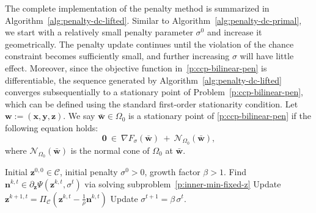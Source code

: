 \documentclass[11pt]{article}
\def\bs{\boldsymbol}
\def\C{\mathcal{C}}
\def\N{\mathcal{N}}
\begin{document}
The complete implementation of the penalty method is summarized in Algorithm~\ref{alg:penalty-dc-lifted}. Similar to Algorithm~\ref{alg:penalty-dc-primal}, we start with a relatively small penalty parameter $\sigma^0$ and increase it geometrically. The penalty update continues until the violation of the chance constraint becomes sufficiently small, and further increasing $\sigma$ will have little effect. Moreover, since the objective function in~\eqref{p:ccp-bilinear-pen} is differentiable, the sequence generated by Algorithm~\ref{alg:penalty-dc-lifted} converges subsequentially to a stationary point of Problem~\eqref{p:ccp-bilinear-pen}, which can be defined using the standard first-order stationarity condition. Let $\bs{w}:=(\bs{x},\bs{y},\bs{z})$. We say $\bar{\bs{w}}\in\Omega_0$ is a stationary point of \eqref{p:ccp-bilinear-pen} if the following equation holds:
\begin{equation*} 
\bs{0}\ \in\ \nabla F_\sigma(\bar{\bs{w}})\ +\ \N_{\Omega_0}(\bar{\bs{w}}),
\end{equation*}
where $\N_{\Omega_0}(\bar{\bs{w}})$ is the normal cone of $\Omega_0$ at $\bar{\bs{w}}$.

\begin{algorithm}[ht]
\caption{Penalty Based Proximal DC Algorithm in the Lifted Space}\label{alg:penalty-dc-lifted}
\begin{algorithmic}[1]
\Require Initial $\bs{z}^{0,0} \in \C$, initial penalty $\sigma^0>0$, growth factor $\beta>1$.
\State Find $\bs{n}^{k,t} \in \partial_{\bs{z}}\Psi(\bs{z}^{k,t},\sigma^t)$ via solving subproblem~\eqref{p:inner-min-fixed-z}
\State Update $\bs{z}^{k+1,t} = \Pi_{\C}(\bs{z}^{k,t}-\frac{1}{\rho}\bs{n}^{k,t})$
\EndFor
\State Update $\sigma^{t+1} = \beta\,\sigma^t$.
\EndFor
\end{algorithmic}
\end{algorithm}
\end{document}
